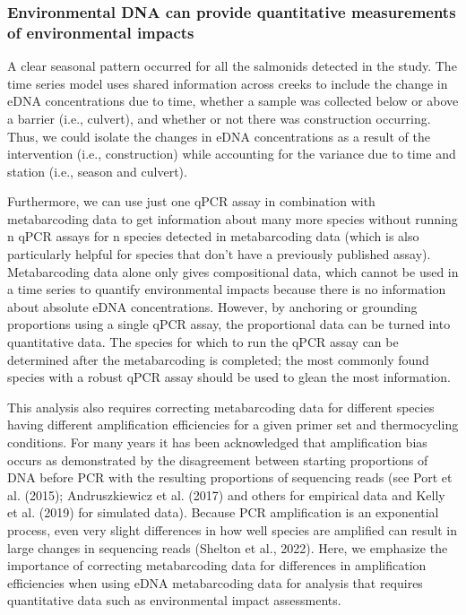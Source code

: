 \documentclass[
]{article}
\begin{document}
\hypertarget{environmental-dna-can-provide-quantitative-measurements-of-environmental-impacts}{%
\subsubsection{Environmental DNA can provide quantitative measurements
of environmental
impacts}\label{environmental-dna-can-provide-quantitative-measurements-of-environmental-impacts}}

A clear seasonal pattern occurred for all the salmonids detected in the
study. The time series model uses shared information across creeks to
include the change in eDNA concentrations due to time, whether a sample
was collected below or above a barrier (i.e., culvert), and whether or
not there was construction occurring. Thus, we could isolate the changes
in eDNA concentrations as a result of the intervention (i.e.,
construction) while accounting for the variance due to time and station
(i.e., season and culvert).

Furthermore, we can use just one qPCR assay in combination with
metabarcoding data to get information about many more species without
running n qPCR assays for n species detected in metabarcoding data
(which is also particularly helpful for species that don't have a
previously published assay). Metabarcoding data alone only gives
compositional data, which cannot be used in a time series to quantify
environmental impacts because there is no information about absolute
eDNA concentrations. However, by anchoring or grounding proportions
using a single qPCR assay, the proportional data can be turned into
quantitative data. The species for which to run the qPCR assay can be
determined after the metabarcoding is completed; the most commonly found
species with a robust qPCR assay should be used to glean the most
information.

This analysis also requires correcting metabarcoding data for different
species having different amplification efficiencies for a given primer
set and thermocycling conditions. For many years it has been
acknowledged that amplification bias occurs as demonstrated by the
disagreement between starting proportions of DNA before PCR with the
resulting proportions of sequencing reads (see Port et al. (2015);
Andruszkiewicz et al. (2017) and others for empirical data and Kelly et
al. (2019) for simulated data). Because PCR amplification is an
exponential process, even very slight differences in how well species
are amplified can result in large changes in sequencing reads (Shelton
et al., 2022). Here, we emphasize the importance of correcting
metabarcoding data for differences in amplification efficiencies when
using eDNA metabarcoding data for analysis that requires quantitative
data such as environmental impact assessments.
\end{document}
